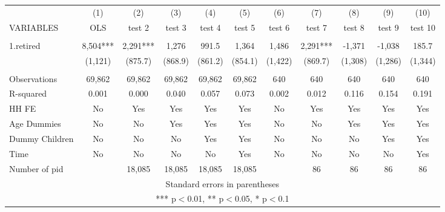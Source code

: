 \begin{tabular}{lcccccccccc} \hline
 & (1) & (2) & (3) & (4) & (5) & (6) & (7) & (8) & (9) & (10) \\
VARIABLES & OLS & test 2 & test 3 & test 4 & test 5 & test 6 & test 7 & test 8 & test 9 & test 10 \\ \hline
 &  &  &  &  &  &  &  &  &  &  \\
1.retired & 8,504*** & 2,291*** & 1,276 & 991.5 & 1,364 & 1,486 & 2,291*** & -1,371 & -1,038 & 185.7 \\
 & (1,121) & (875.7) & (868.9) & (861.2) & (854.1) & (1,422) & (869.7) & (1,308) & (1,286) & (1,344) \\
 &  &  &  &  &  &  &  &  &  &  \\
Observations & 69,862 & 69,862 & 69,862 & 69,862 & 69,862 & 640 & 640 & 640 & 640 & 640 \\
R-squared & 0.001 & 0.000 & 0.040 & 0.057 & 0.073 & 0.002 & 0.012 & 0.116 & 0.154 & 0.191 \\
HH FE & No & Yes & Yes & Yes & Yes & No & Yes & Yes & Yes & Yes \\
Age Dummies & No & No & Yes & Yes & Yes & No & No & Yes & Yes & Yes \\
Dummy Children & No & No & No & Yes & Yes & No & No & No & Yes & Yes \\
Time & No & No & No & No & Yes & No & No & No & No & Yes \\
 Number of pid &  & 18,085 & 18,085 & 18,085 & 18,085 &  & 86 & 86 & 86 & 86 \\ \hline
\multicolumn{11}{c}{ Standard errors in parentheses} \\
\multicolumn{11}{c}{ *** p$<$0.01, ** p$<$0.05, * p$<$0.1} \\
\end{tabular}
